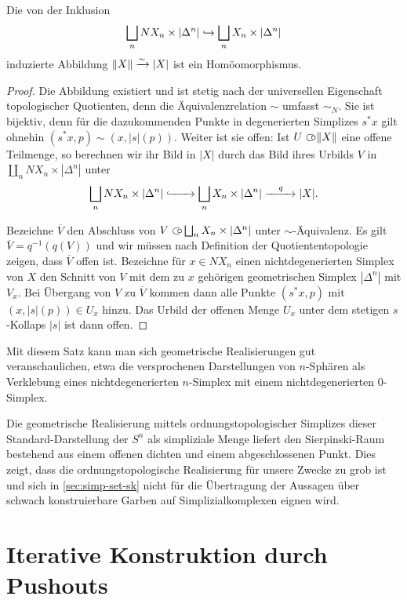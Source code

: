 \begin{satz}
  Die von der Inklusion
  \[ \coprod_n NX_n \times |\Delta^n| \inj \coprod_n X_n \times |\Delta^n| \]
  induzierte Abbildung $\|X\| \iso |X|$ ist ein Homöomorphismus.
\end{satz}
\begin{proof}
  Die Abbildung existiert und ist stetig nach der universellen
  Eigenschaft topologischer Quotienten, denn die Äquivalenzrelation
  $\sim$ umfasst $\sim_N$. Sie ist bijektiv, denn für die
  dazukommenden Punkte in degenerierten Simplizes $s^* x$ gilt ohnehin
  $(s^* x, p) \sim (x, |s|(p))$. Weiter ist sie offen: Ist $U \open
  \|X\|$ eine offene Teilmenge, so berechnen wir ihr Bild in $|X|$
  durch das Bild ihres Urbilds $V$ in $\coprod_n NX_n \times
  |\Delta^n|$ unter
  \[ \coprod_n NX_n \times |\Delta^n|
  \xhookrightarrow{\qquad} \coprod_n X_n \times |\Delta^n|
  \xrightarrow{\quad\scriptsize{q}\quad} |X|. \]

  Bezeichne $\overline{V}$ den Abschluss von $V \open \coprod_n X_n
  \times |\Delta^n|$ unter $\sim$-Äquivalenz. Es gilt $\overline{V} =
  q^{-1}(q(V))$ und wir müssen nach Definition der Quotiententopologie
  zeigen, dass $\overline{V}$ offen ist. Bezeichne für $x \in NX_n$
  einen nichtdegenerierten Simplex von $X$ den Schnitt von $V$ mit dem
  zu $x$ gehörigen geometrischen Simplex $|\Delta^n|$ mit $V_x$. Bei
  Übergang von $V$ zu $\overline{V}$ kommen dann alle Punkte $(s^* x,
  p)$ mit $(x, |s|(p)) \in U_x$ hinzu. Das Urbild der offenen Menge
  $U_x$ unter dem stetigen $s$-Kollaps $|s|$ ist dann offen.
\end{proof}
Mit diesem Satz kann man sich geometrische Realisierungen gut
veranschaulichen, etwa die versprochenen Darstellungen von $n$-Sphären
als Verklebung eines nichtdegenerierten $n$-Simplex mit einem
nichtdegenerierten $0$-Simplex.
\begin{bsp} \label{ex:clumsy-sphere}
  Die geometrische Realisierung mittels ordnungstopologischer
  Simplizes dieser Standard-Darstellung der $S^n$ als simpliziale
  Menge liefert den Sierpinski-Raum bestehend aus einem offenen
  dichten und einem abgeschlossenen Punkt. Dies zeigt, dass die
  ordnungstopologische Realisierung für unsere Zwecke zu grob ist und
  sich in \ref{sec:simp-set-sk} nicht für die Übertragung der Aussagen
  über schwach konstruierbare Garben auf Simplizialkomplexen eignen
  wird.
\end{bsp}

\section{Iterative Konstruktion durch Pushouts}

